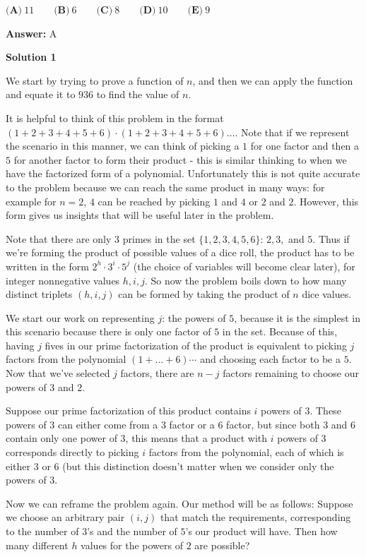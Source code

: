 \begin{enumerate}
 $\textbf{(A)}~11\qquad\textbf{(B)}~6\qquad\textbf{(C)}~8\qquad\textbf{(D)}~10\qquad\textbf{(E)}~9$

 \textbf{Answer: }A



\textbf{Solution 1}

We start by trying to prove a function of $n$, and then we can apply the function and equate it to $936$ to find the value of $n$.

 It is helpful to think of this problem in the format $(1+2+3+4+5+6) \cdot (1+2+3+4+5+6) \dots$. Note that if we represent the scenario in this manner, we can think of picking a $1$ for one factor and then a $5$ for another factor to form their product - this is similar thinking to when we have the factorized form of a polynomial. Unfortunately this is not quite accurate to the problem because we can reach the same product in many ways: for example for $n=2$, $4$ can be reached by picking $1$ and $4$ or $2$ and $2$. However, this form gives us insights that will be useful later in the problem.

 Note that there are only $3$ primes in the set $\{1,2,3,4,5,6\}$: $2,3,$ and $5$. Thus if we're forming the product of possible values of a dice roll, the product has to be written in the form $2^h \cdot 3^i \cdot 5^j$ (the choice of variables will become clear later), for integer nonnegative values $h,i,j$. So now the problem boils down to how many distinct triplets $(h,i,j)$ can be formed by taking the product of $n$ dice values. 

 We start our work on representing $j$: the powers of $5$, because it is the simplest in this scenario because there is only one factor of $5$ in the set. Because of this, having $j$ fives in our prime factorization of the product is equivalent to picking $j$ factors from the polynomial $(1+\dots + 6) \cdots$ and choosing each factor to be a $5$. Now that we've selected $j$ factors, there are $n-j$ factors remaining to choose our powers of $3$ and $2$. 

 Suppose our prime factorization of this product contains $i$ powers of $3$. These powers of $3$ can either come from a $3$ factor or a $6$ factor, but since both $3$ and $6$ contain only one power of $3$, this means that a product with $i$ powers of $3$ corresponds directly to picking $i$ factors from the polynomial, each of which is either $3$ or $6$ (but this distinction doesn't matter when we consider only the powers of $3$. 

 Now we can reframe the problem again. Our method will be as follows: Suppose we choose an arbitrary pair $(i,j)$ that match the requirements, corresponding to the number of $3$'s and the number of $5$'s our product will have. Then how many different $h$ values for the powers of $2$ are possible?


\end{enumerate}
